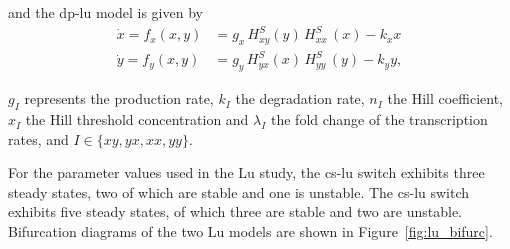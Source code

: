 and the \acrshort{dp-lu} model is given by
\begin{align}
\dot{x} = f_{x}(x,y) &= g_{x}\, H^{S}_{xy}(y)\, H^{S}_{xx}\,(x)-k_{x}x \\
\dot{y} = f_{y}(x,y) &= g_{y}\,H^{S}_{yx}(x)\,H^{S}_{yy}\,(y)-k_{y}y,
\end{align}

\noindent $g_I$ represents the production rate, $k_I$ the degradation rate, $n_I$ the Hill coefficient, $x_I$ the Hill threshold concentration and $\lambda_I$ the fold change of the transcription rates, and $I\in\{xy, yx, xx, yy\}$.

For the parameter values used in the Lu study, the \acrshort{cs-lu} switch exhibits three steady states, two of which are stable and one is unstable. The \acrshort{cs-lu} switch exhibits five steady states, of which three are stable and two are unstable. Bifurcation diagrams of the two Lu models are shown in Figure~\ref{fig:lu_bifurc}. 


